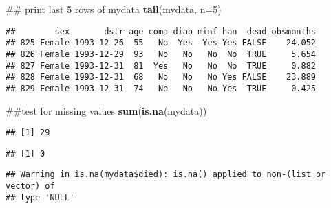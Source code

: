 \documentclass[]{book}
\newenvironment{Shaded}{\begin{snugshade}}{\end{snugshade}}
\newcommand{\KeywordTok}[1]{\textcolor[rgb]{0.13,0.29,0.53}{\textbf{#1}}}
\newcommand{\DataTypeTok}[1]{\textcolor[rgb]{0.13,0.29,0.53}{#1}}
\newcommand{\DecValTok}[1]{\textcolor[rgb]{0.00,0.00,0.81}{#1}}
\newcommand{\OperatorTok}[1]{\textcolor[rgb]{0.81,0.36,0.00}{\textbf{#1}}}
\newcommand{\NormalTok}[1]{#1}
\theoremstyle{definition}
\theoremstyle{definition}
\theoremstyle{definition}
\theoremstyle{remark}
\begin{document}
\begin{Shaded}
\begin{Highlighting}[]
\NormalTok{## print last 5 rows of mydata}
\KeywordTok{tail}\NormalTok{(mydata, }\DataTypeTok{n=}\DecValTok{5}\NormalTok{)}
\end{Highlighting}
\end{Shaded}

\begin{verbatim}
##        sex       dstr age coma diab minf han  dead obsmonths
## 825 Female 1993-12-26  55   No  Yes  Yes Yes FALSE    24.052
## 826 Female 1993-12-29  93   No   No   No  No  TRUE     5.654
## 827 Female 1993-12-31  81  Yes   No   No  No  TRUE     0.882
## 828 Female 1993-12-31  68   No   No   No Yes FALSE    23.889
## 829 Female 1993-12-31  74   No   No   No Yes  TRUE     0.425
\end{verbatim}

\begin{Shaded}
\begin{Highlighting}[]
\NormalTok{##test for missing values}
\KeywordTok{sum}\NormalTok{(}\KeywordTok{is.na}\NormalTok{(mydata))}
\end{Highlighting}
\end{Shaded}

\begin{verbatim}
## [1] 29
\end{verbatim}

\begin{Shaded}
\end{Shaded}

\begin{verbatim}
## [1] 0
\end{verbatim}

\begin{Shaded}
\end{Shaded}

\begin{verbatim}
## Warning in is.na(mydata$died): is.na() applied to non-(list or vector) of
## type 'NULL'
\end{verbatim}
\end{document}
